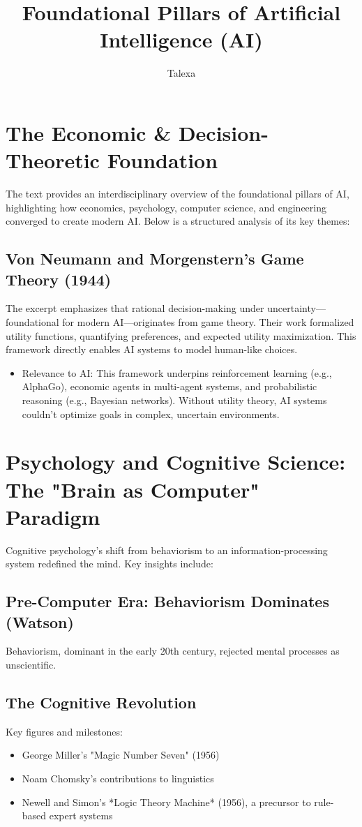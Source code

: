 \documentclass{article}
\title{Foundational Pillars of Artificial Intelligence (AI)}
\author{Talexa}
\date{}
\begin{document}
\maketitle

\section{The Economic \& Decision-Theoretic Foundation}
The text provides an interdisciplinary overview of the foundational pillars of AI, highlighting how economics, psychology, computer science, and engineering converged to create modern AI. Below is a structured analysis of its key themes:

\subsection{Von Neumann and Morgenstern's Game Theory (1944)}
The excerpt emphasizes that rational decision-making under uncertainty—foundational for modern AI—originates from game theory. Their work formalized utility functions, quantifying preferences, and expected utility maximization. This framework directly enables AI systems to model human-like choices.

\begin{itemize}
    \item Relevance to AI: This framework underpins reinforcement learning (e.g., AlphaGo), economic agents in multi-agent systems, and probabilistic reasoning (e.g., Bayesian networks). Without utility theory, AI systems couldn’t optimize goals in complex, uncertain environments.
\end{itemize}

\section{Psychology and Cognitive Science: The "Brain as Computer" Paradigm}
Cognitive psychology's shift from behaviorism to an information-processing system redefined the mind. Key insights include:

\subsection{Pre-Computer Era: Behaviorism Dominates (Watson)}
Behaviorism, dominant in the early 20th century, rejected mental processes as unscientific.

\subsection{The Cognitive Revolution}
Key figures and milestones:
\begin{itemize}
    \item George Miller’s "Magic Number Seven" (1956)
    \item Noam Chomsky's contributions to linguistics
    \item Newell and Simon’s *Logic Theory Machine* (1956), a precursor to rule-based expert systems
\end{itemize}
\end{document}
